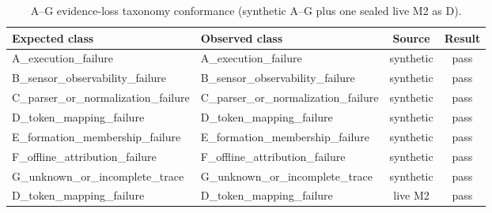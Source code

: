 \begin{table}[!t]
\caption{A--G evidence-loss taxonomy conformance (synthetic A--G plus one sealed live M2 as D).}
\label{tab:taxonomy-ag}
\centering
\scriptsize
\begin{tabular}{@{}llcc@{}}
\toprule
\textbf{Expected class} & \textbf{Observed class} & \textbf{Source} & \textbf{Result} \\
\midrule
A\_execution\_failure & A\_execution\_failure & synthetic & pass \\
B\_sensor\_observability\_failure & B\_sensor\_observability\_failure & synthetic & pass \\
C\_parser\_or\_normalization\_failure & C\_parser\_or\_normalization\_failure & synthetic & pass \\
D\_token\_mapping\_failure & D\_token\_mapping\_failure & synthetic & pass \\
E\_formation\_membership\_failure & E\_formation\_membership\_failure & synthetic & pass \\
F\_offline\_attribution\_failure & F\_offline\_attribution\_failure & synthetic & pass \\
G\_unknown\_or\_incomplete\_trace & G\_unknown\_or\_incomplete\_trace & synthetic & pass \\
D\_token\_mapping\_failure & D\_token\_mapping\_failure & live M2 & pass \\
\bottomrule
\end{tabular}
\end{table}
